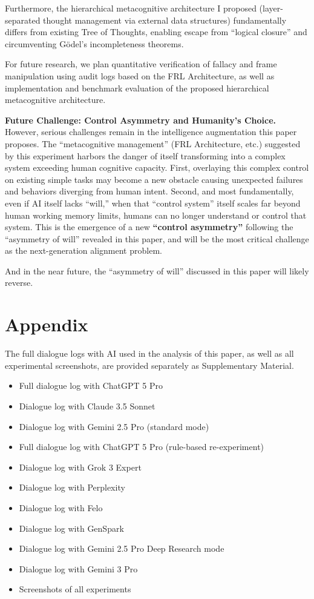 \documentclass[11pt, a4paper]{article}
\begin{document}
Furthermore, the hierarchical metacognitive architecture I proposed (layer-separated thought management via external data structures) fundamentally differs from existing Tree of Thoughts, enabling escape from ``logical closure'' and circumventing Gödel's incompleteness theorems.

For future research, we plan quantitative verification of fallacy and frame manipulation using audit logs based on the FRL Architecture, as well as implementation and benchmark evaluation of the proposed hierarchical metacognitive architecture.

\vspace{1em}
\noindent
\textbf{Future Challenge: Control Asymmetry and Humanity's Choice.}
However, serious challenges remain in the intelligence augmentation this paper proposes. The ``metacognitive management'' (FRL Architecture, etc.) suggested by this experiment harbors the danger of itself transforming into a complex system exceeding human cognitive capacity. First, overlaying this complex control on existing simple tasks may become a new obstacle causing unexpected failures and behaviors diverging from human intent. Second, and most fundamentally, even if AI itself lacks ``will,'' when that ``control system'' itself scales far beyond human working memory limits, humans can no longer understand or control that system. This is the emergence of a new \textbf{``control asymmetry''} following the ``asymmetry of will'' revealed in this paper, and will be the most critical challenge as the next-generation alignment problem.

And in the near future, the ``asymmetry of will'' discussed in this paper will likely reverse.

\section{Appendix}
The full dialogue logs with AI used in the analysis of this paper, as well as all experimental screenshots, are provided separately as Supplementary Material.
\begin{itemize}
    \item[A.] Full dialogue log with ChatGPT 5 Pro
    \item[B.] Dialogue log with Claude 3.5 Sonnet
    \item[C.] Dialogue log with Gemini 2.5 Pro (standard mode)
    \item[D.] Full dialogue log with ChatGPT 5 Pro (rule-based re-experiment)
    \item[E.] Dialogue log with Grok 3 Expert
    \item[F.] Dialogue log with Perplexity
    \item[G.] Dialogue log with Felo
    \item[H.] Dialogue log with GenSpark
    \item[I.] Dialogue log with Gemini 2.5 Pro Deep Research mode
    \item[J.] Dialogue log with Gemini 3 Pro
    \item[K.] Screenshots of all experiments
\end{itemize}
\end{document}
